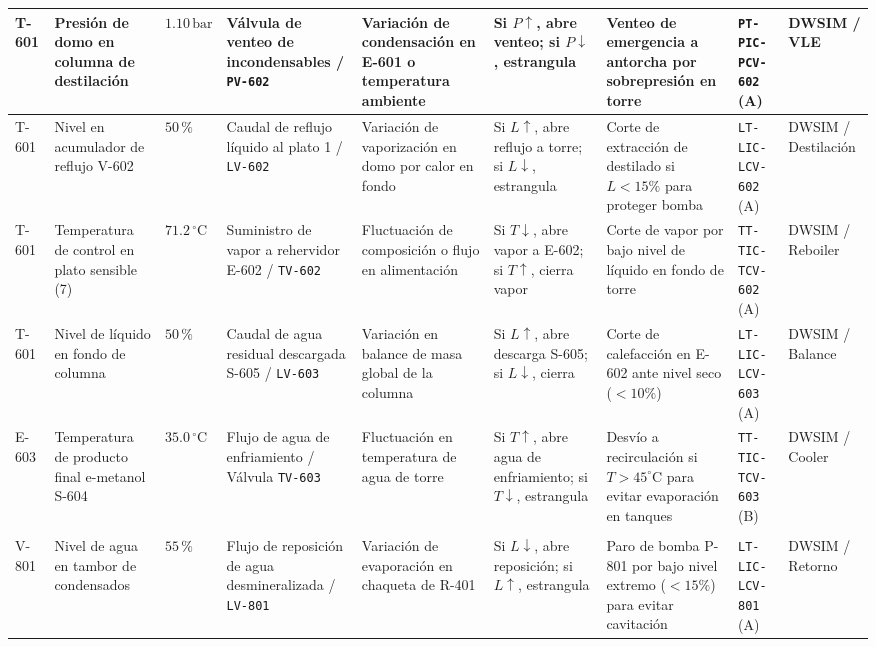 \documentclass[10pt,letterpaper]{article}
\begin{document}
\begin{landscape}
\begin{longtable}{|p{1.4cm}|p{2.3cm}|p{2.0cm}|p{2.9cm}|p{2.8cm}|p{3.0cm}|p{3.4cm}|p{2.5cm}|p{1.5cm}|}
T-601 & Presión de domo en columna de destilación & $1.10\,\text{bar}$ & Válvula de venteo de incondensables / \texttt{PV-602} & Variación de condensación en E-601 o temperatura ambiente & Si $P \uparrow$, abre venteo; si $P \downarrow$, estrangula & Venteo de emergencia a antorcha por sobrepresión en torre & \texttt{PT-PIC-PCV-602} (A) & DWSIM / VLE \\ \hline

T-601 & Nivel en acumulador de reflujo V-602 & $50\,\%$ & Caudal de reflujo líquido al plato 1 / \texttt{LV-602} & Variación de vaporización en domo por calor en fondo & Si $L \uparrow$, abre reflujo a torre; si $L \downarrow$, estrangula & Corte de extracción de destilado si $L < 15\%$ para proteger bomba & \texttt{LT-LIC-LCV-602} (A) & DWSIM / Destilación \\ \hline

T-601 & Temperatura de control en plato sensible (7) & $71.2\,^\circ\text{C}$ & Suministro de vapor a rehervidor E-602 / \texttt{TV-602} & Fluctuación de composición o flujo en alimentación & Si $T \downarrow$, abre vapor a E-602; si $T \uparrow$, cierra vapor & Corte de vapor por bajo nivel de líquido en fondo de torre & \texttt{TT-TIC-TCV-602} (A) & DWSIM / Reboiler \\ \hline

T-601 & Nivel de líquido en fondo de columna & $50\,\%$ & Caudal de agua residual descargada S-605 / \texttt{LV-603} & Variación en balance de masa global de la columna & Si $L \uparrow$, abre descarga S-605; si $L \downarrow$, cierra & Corte de calefacción en E-602 ante nivel seco ($<10\%$) & \texttt{LT-LIC-LCV-603} (A) & DWSIM / Balance \\ \hline

E-603 & Temperatura de producto final e-metanol S-604 & $35.0\,^\circ\text{C}$ & Flujo de agua de enfriamiento / Válvula \texttt{TV-603} & Fluctuación en temperatura de agua de torre & Si $T \uparrow$, abre agua de enfriamiento; si $T \downarrow$, estrangula & Desvío a recirculación si $T > 45^\circ\text{C}$ para evitar evaporación en tanques & \texttt{TT-TIC-TCV-603} (B) & DWSIM / Cooler \\ \hline

\rowcolor{tablerowalt}\multicolumn{9}{|l|}{\textbf{\color{navyblue}Área 800: Sistema de Chaqueta y Generación de Vapor (ZLD)}} \\ \hline

V-801 & Nivel de agua en tambor de condensados & $55\,\%$ & Flujo de reposición de agua desmineralizada / \texttt{LV-801} & Variación de evaporación en chaqueta de R-401 & Si $L \downarrow$, abre reposición; si $L \uparrow$, estrangula & Paro de bomba P-801 por bajo nivel extremo ($<15\%$) para evitar cavitación & \texttt{LT-LIC-LCV-801} (A) & DWSIM / Retorno \\ \hline


\end{longtable}
\end{landscape}
\end{document}
